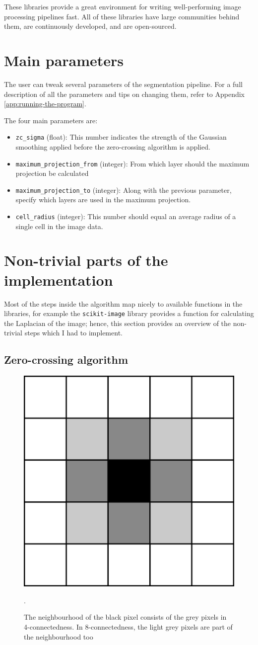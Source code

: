 \documentclass[
  digital,     %
  oneside,     %
  nosansbold,  %
  nocolorbold, %
  lof,         %
  lot,         %
]{fithesis4}
\begin{document}
These libraries provide a great environment for writing well-performing image
processing pipelines fast. All of these libraries have large communities
behind them, are continuously developed, and are open-sourced.

\section{Main parameters}
The user can tweak several parameters of the segmentation pipeline. For a full description of all
the parameters and tips on changing them, refer to Appendix \ref{app:running-the-program}.

The four main parameters are:
\begin{itemize}
    \item \texttt{zc\_sigma} (float): This number indicates the strength of the Gaussian smoothing
    applied before the zero-crossing algorithm is applied.
    \item \texttt{maximum\_projection\_from} (integer): From which layer should the maximum projection
    be calculated
    \item \texttt{maximum\_projection\_to} (integer): Along with the previous parameter, specify which layers are used in the maximum projection.
    \item \texttt{cell\_radius} (integer): This number should equal an average radius of a single cell in
    the image data.
\end{itemize}

\section{Non-trivial parts of the implementation}
Most of the steps inside the algorithm map nicely to available functions in the
libraries, for example the \texttt{scikit-image} library provides a function for
calculating the Laplacian of the image; hence, this section provides an overview of
the non-trivial steps which I had to implement.

\subsection{Zero-crossing algorithm}

\begin{figure}
    \begin{center}
        \includegraphics[width=0.3\linewidth]{resources/neighbourhood.png}
    \end{center}
    \caption{The neighbourhood of the black pixel consists of the grey pixels in
    4-connectedness. In 8-connectedness, the light grey pixels are part of the
    neighbourhood too}.
    \label{fig:neighbourhood}
\end{figure}
\end{document}
